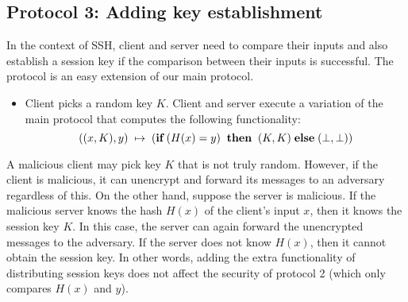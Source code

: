 




\subsection{Protocol 3: Adding key establishment}
\label{sec:protod}

In the context of SSH, client and server need to compare their inputs and
also establish a session key if the comparison between their inputs is 
successful.  The protocol is an easy extension of our main protocol.
\begin{itemize}
\item Client picks a random key $K$. Client and server execute a variation of the main protocol
that computes the following functionality:
\[
((x,K),y) \; \mapsto \; (\mbox{\bf if} \; (H(x) = y) \;\; \mbox{\bf
then} \;\; (K,K) \;\mbox{\bf else} \; (\bot,\bot))
\]
\end{itemize}

A malicious client may pick key $K$ that is not truly random.  However,
if the client is malicious, it can unencrypt and forward its messages to
an adversary regardless of this. On the other hand, suppose the server is
malicious. If the malicious server knows the hash $H(x)$ of the client's
input $x$, then it knows the session key $K$. In this case, the server
can again forward the unencrypted messages to the adversary. If the
server does not know $H(x)$, then it cannot obtain the session key. In
other words, adding the extra functionality of distributing session keys
does not affect the security of protocol 2 (which only compares $H(x)$
and $y$).



